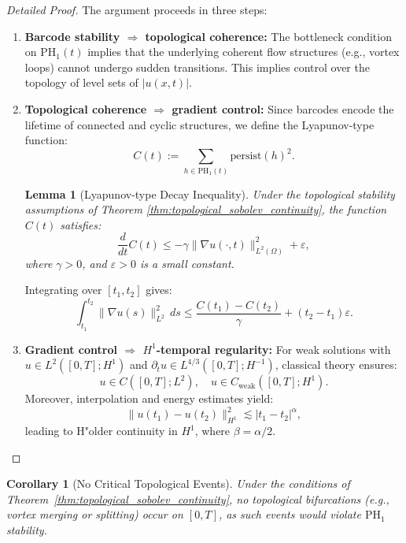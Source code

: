 \documentclass[11pt]{article}
\newtheorem{lemma}[theorem]{Lemma}
\newtheorem{corollary}[theorem]{Corollary}
\theoremstyle{definition}
\begin{document}
\begin{proof}[Detailed Proof]
The argument proceeds in three steps:

\begin{enumerate}
    \item \textbf{Barcode stability $\Rightarrow$ topological coherence:} The bottleneck condition on $\mathrm{PH}_1(t)$ implies that the underlying coherent flow structures (e.g., vortex loops) cannot undergo sudden transitions. This implies control over the topology of level sets of $|u(x,t)|$.

    \item \textbf{Topological coherence $\Rightarrow$ gradient control:} Since barcodes encode the lifetime of connected and cyclic structures, we define the Lyapunov-type function:
    \[ C(t) := \sum_{h \in \mathrm{PH}_1(t)} \mathrm{persist}(h)^2. \]
    \begin{lemma}[Lyapunov-type Decay Inequality]
    \label{lem:lyapunov_decay}
    Under the topological stability assumptions of Theorem \ref{thm:topological_sobolev_continuity}, the function $C(t)$ satisfies:
    \[ \frac{d}{dt}C(t) \leq -\gamma \|\nabla u(\cdot,t)\|_{L^2(\Omega)}^2 + \varepsilon, \]
    where $\gamma > 0$, and $\varepsilon > 0$ is a small constant.
    \end{lemma}
    Integrating over $[t_1,t_2]$ gives:
    \[ \int_{t_1}^{t_2} \|\nabla u(s)\|_{L^2}^2 \, ds \leq \frac{C(t_1)-C(t_2)}{\gamma} + (t_2 - t_1)\varepsilon. \]

    \item \textbf{Gradient control $\Rightarrow$ $H^1$-temporal regularity:}
    For weak solutions with $u \in L^2([0,T]; H^1)$ and $\partial_t u \in L^{4/3}([0,T]; H^{-1})$, classical theory ensures:
    \[ u \in C([0,T]; L^2), \quad u \in C_{\text{weak}}([0,T]; H^1). \]
    Moreover, interpolation and energy estimates yield:
    \[ \|u(t_1) - u(t_2)\|_{H^1}^2 \lesssim |t_1 - t_2|^{\alpha}, \]
    leading to H"older continuity in $H^1$, where $\beta = \alpha/2$.
\end{enumerate}
\end{proof}

\begin{corollary}[No Critical Topological Events]
Under the conditions of Theorem~\ref{thm:topological_sobolev_continuity}, no topological bifurcations (e.g., vortex merging or splitting) occur on $[0,T]$, as such events would violate $\mathrm{PH}_1$ stability.
\end{corollary}
\end{document}
